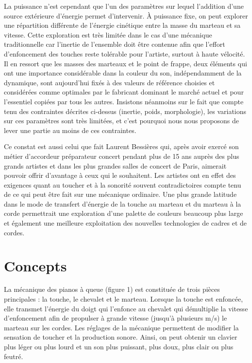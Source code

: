 \documentclass[french,a4paper,12pt]{report}
\begin{document}
La puissance n’est cependant que l’un des paramètres sur lequel l’addition d’une source extérieure d’énergie permet d’intervenir. À puissance fixe, on peut explorer une répartition différente de l’énergie cinétique entre la masse du marteau et sa vitesse. Cette exploration est très limitée dans le cas d’une mécanique traditionnelle car l’inertie de l’ensemble doit être contenue afin que l’effort d’enfoncement des touches reste tolérable pour l’artiste, surtout à haute vélocité. Il en ressort que les masses des marteaux et le point de frappe, deux éléments qui ont une importance considérable dans la couleur du son, indépendamment de la dynamique, sont aujourd’hui fixés à des valeurs de référence choisies et considérées comme optimales par le fabricant dominant le marché actuel et pour l’essentiel copiées par tous les autres. Insistons néanmoins sur le fait que compte tenu des contraintes décrites ci-dessus (inertie, poids, morphologie), les variations sur ces paramètres sont très limitées, et c’est pourquoi nous nous proposons de lever une partie au moins de ces contraintes.

Ce constat est aussi celui que fait Laurent Bessières qui, après avoir exercé son métier d’accordeur préparateur concert pendant plus de 15 ans auprès des plus grands artistes et dans les plus grandes salles de concert de Paris, aimerait pouvoir offrir d’avantage à ceux qui le souhaitent. Les artistes ont en effet des exigences quant au toucher et à la sonorité souvent contradictoires compte tenu de ce qui peut être fait sur une mécanique ordinaire. Une plus grande latitude dans le mode de transfert d’énergie de la touche au marteau et du marteau à la corde permettrait une exploration d’une palette de couleurs beaucoup plus large et également une meilleure exploitation des nouvelles technologies de cadres et de cordes.

\section{Concepts} 

La mécanique des pianos à queue (figure 1) est constituée de trois pièces principales : la touche, le chevalet et le marteau. Lorsque la touche est enfoncée, elle transmet l’énergie du doigt qui l’enfonce au chevalet qui démultiplie la vitesse d’enfoncement afin de propulser à grande vitesse (jusqu’à plusieurs m/s) le marteau sur les cordes. Les réglages de la mécanique permettent de modifier la sensation de toucher et la production sonore. Ainsi, on peut obtenir un clavier plus léger ou plus lourd et un son plus puissant, plus doux, plus clair ou plus feutré.
\end{document}
